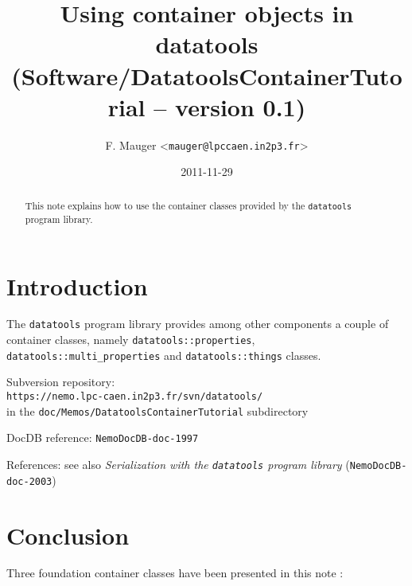 \documentclass[a4paper,12pt]{article}
\title{Using container objects in datatools\\%
{\small{(Software/DatatoolsContainerTutorial -- version 0.1)}}}
\author{F. Mauger <\texttt{mauger@lpccaen.in2p3.fr}>}
\date{2011-11-29}
\newcommand{\pn}{\par\noindent}
\begin{document}
\maketitle

\begin{abstract}
This note  explains how to use  the container classes  provided by the
\texttt{datatools} program library.
\end{abstract}

\tableofcontents

\section{Introduction}

\pn  The  \texttt{datatools}  program library  provides  among  other
components     a    couple     of     container    classes,     namely
\texttt{datatools::properties},   \texttt{datatools::multi\_properties}
and \texttt{datatools::things} classes.

\vskip 5mm
\pn
Subversion repository:\\
\texttt{https://nemo.lpc-caen.in2p3.fr/svn/datatools/} \\
in the \texttt{doc/Memos/DatatoolsContainerTutorial} subdirectory
\pn
DocDB reference: \texttt{NemoDocDB-doc-1997}
\pn
References: see also \textit{Serialization with the \texttt{datatools} program library} 
(\texttt{NemoDocDB-doc-2003})

\clearpage


\clearpage


\clearpage


\clearpage

\section{Conclusion}

\pn  Three foundation container  classes have  been presented  in this
note :
\end{document}
